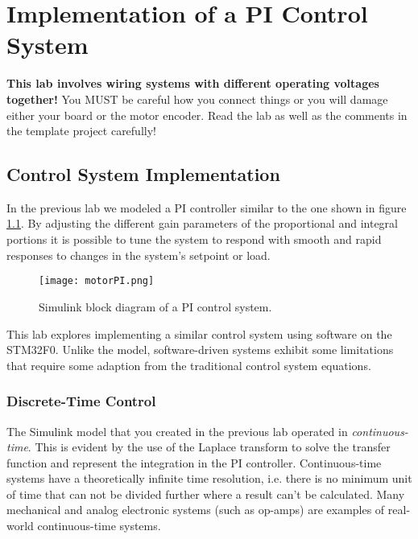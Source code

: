 \documentclass[11pt,fleqn]{book} %
\begin{document}
	
\chapter{Implementation of a PI Control System}

\begin{warning}
    \textbf{This lab involves wiring systems with different operating voltages together!} You MUST be careful how you connect things or you will damage either your board or the motor encoder. Read the lab as well as the comments in the template project carefully!
\end{warning}

\section{Control System Implementation}

In the previous lab we modeled a PI controller similar to the one shown in figure \ref{motorPI}. By adjusting the different gain parameters of the proportional and integral portions it is possible to tune the system to respond with smooth and rapid responses to changes in the system's setpoint or load. 

\begin{figure}[tb]
    \centering\texttt{[image: motorPI.png]}
    \caption{Simulink block diagram of a PI control system.}
    \label{motorPI}
\end{figure}

This lab explores implementing a similar control system using software on the STM32F0. Unlike the model, software-driven systems exhibit some limitations that require some adaption from the traditional control system equations. 

\subsection{Discrete-Time Control}

The Simulink model that you created in the previous lab operated in \textit{continuous-time}. This is evident by the use of the Laplace transform to solve the transfer function and represent the integration in the PI controller. Continuous-time systems have a theoretically infinite time resolution, i.e. there is no minimum unit of time that can not be divided further where a result can't be calculated. Many mechanical and analog electronic systems (such as op-amps) are examples of real-world continuous-time systems. 
\end{document}
